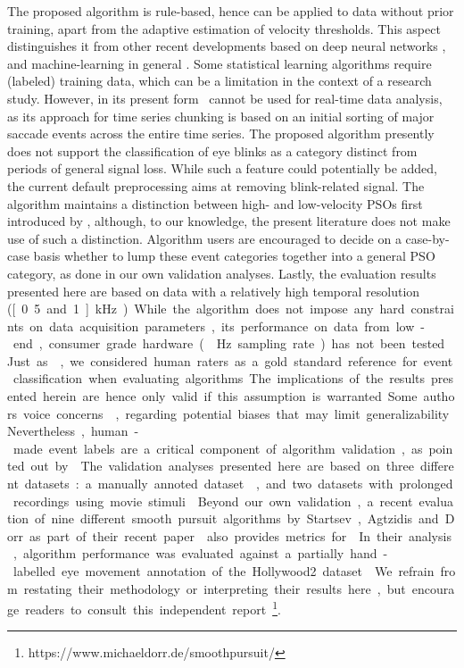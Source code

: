 The proposed algorithm is rule-based, hence can be applied to data without
prior training, apart from the adaptive estimation of velocity thresholds.
This aspect distinguishes it from other recent developments based on deep
neural networks \citep{Startsev2018}, and machine-learning in general
\citep{Zemblys2018}.
Some statistical learning algorithms require (labeled) training data,
which can be a limitation in the context of a research study.
However, in its present form \remodnav\ cannot be used for
real-time data analysis, as its approach for time series chunking is based
on an initial sorting of major saccade events across the entire time series.
The proposed algorithm presently does not support the classification of eye blinks
as a category distinct from periods of general signal loss. While such a feature
could potentially be added, the current default preprocessing aims at removing
blink-related signal. The algorithm maintains a distinction between high- and
low-velocity PSOs first introduced by \citet{Nystrom2010AnData}, although, to our knowledge,
the present literature does not make use of such a distinction. Algorithm users
are encouraged to decide on a case-by-case basis whether to lump these event categories
together into a general PSO category, as done in our own validation analyses.
Lastly, the evaluation results presented here are based
on data with a relatively high temporal resolution (\unit[0.5 and 1]{kHz}). While
the algorithm does not impose any hard constraints on data acquisition parameters,
its performance on data from low-end, consumer grade hardware (\eg \unit[50]{Hz}
sampling rate) has not been tested.

Just as \cite{Andersson2017}, we considered human raters as a gold standard
reference for event classification when evaluating algorithms.  The implications of
the results presented herein are hence only valid if this assumption is
warranted. Some authors voice concerns \cite[\eg][]{5523936}, regarding
potential biases that may limit generalizability. Nevertheless, human-made
event labels are a critical component of algorithm validation, as pointed out
by \cite{Hooge2018}.

The validation analyses presented here are based on three different datasets:
a manually annoted dataset \citep{Andersson2017}, and two datasets with
prolonged recordings using movie stimuli \citep{Hanke2016}.
Beyond our own validation, a recent evaluation of nine different smooth
pursuit algorithms by Startsev, Agtzidis and Dorr as part of their recent
paper \citep{Startsev2018} also provides metrics for \remodnav.
In their analysis, algorithm performance was evaluated against a partially
hand-labelled eye movement annotation of the Hollywood2 dataset \citep{Mathe2012}.
We refrain from restating their methodology or interpreting their results here,
but encourage readers to consult this independent
report\footnote{https://www.michaeldorr.de/smoothpursuit/}.

